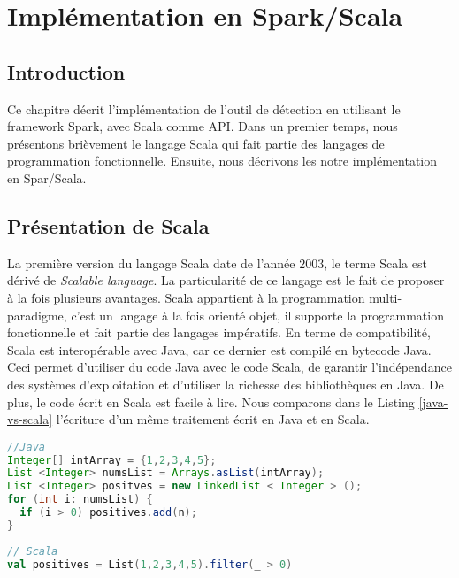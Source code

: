 \chapter{Implémentation  en Spark/Scala} \label{application:spark}

\section{Introduction}

Ce chapitre  décrit  l'implémentation de l'outil de détection en utilisant le framework Spark, avec Scala comme API.  Dans un premier temps, nous présentons brièvement le langage Scala qui fait partie des langages de programmation fonctionnelle. Ensuite, nous 
décrivons les notre implémentation en Spar/Scala.

\section{Présentation de Scala} \label{scala-presentation}


La première version du langage Scala date de l'année $2003$, le terme  Scala  est dérivé de \textit{Scalable language}. 
La particularité de ce langage est le fait de proposer à la fois plusieurs avantages. Scala appartient à la 
programmation multi-paradigme, c'est  un langage à la fois orienté objet, il supporte la programmation fonctionnelle et fait partie des langages impératifs. En terme de compatibilité, Scala est interopérable avec  Java, car ce dernier est compilé en bytecode Java. Ceci permet d'utiliser du code Java avec le code Scala, de garantir l'indépendance des systèmes d'exploitation et d'utiliser la richesse des bibliothèques en Java. De plus, le code écrit en Scala est facile à lire.
Nous comparons dans le Listing \ref{java-vs-scala} l'écriture d'un même traitement écrit en Java et en Scala.
\begin{center}
	\begin{minipage}[t]{.50\textwidth}
\begin{lstlisting}[language=java, basicstyle=\small]
//Java
Integer[] intArray = {1,2,3,4,5};
List <Integer> numsList = Arrays.asList(intArray);
List <Integer> positves = new LinkedList < Integer > ();
for (int i: numsList) {
  if (i > 0) positives.add(n);
}
\end{lstlisting}
	\end{minipage}\hfill
	\begin{minipage}[t]{.49\textwidth}
\begin{lstlisting}[language=scala, basicstyle=\small]
// Scala 
val positives = List(1,2,3,4,5).filter(_ > 0)
\end{lstlisting}
	\end{minipage}
	\label{java-vs-scala}
\end{center}

